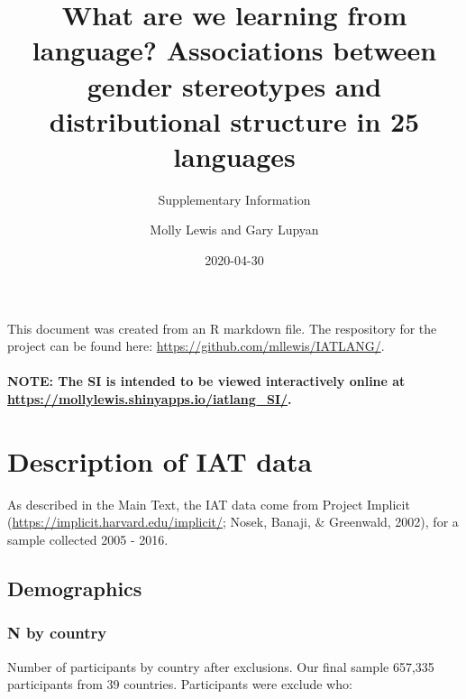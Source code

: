 \documentclass[]{article}
\title{What are we learning from language? Associations between gender
stereotypes and distributional structure in 25 languages}
\subtitle{Supplementary Information}
\author{Molly Lewis and Gary Lupyan}
\date{2020-04-30}
\let\oldparagraph\paragraph
\renewcommand{\paragraph}[1]{\oldparagraph{#1}\mbox{}}
\begin{document}
\maketitle

{
\setcounter{tocdepth}{2}
\tableofcontents
}
\vspace{16pt}

This document was created from an R markdown file. The respository for
the project can be found here:
\url{https://github.com/mllewis/IATLANG/}.

\hypertarget{note-the-si-is-intended-to-be-viewed-interactively-online-at-httpsmollylewis.shinyapps.ioiatlang_si.}{%
\paragraph{\texorpdfstring{NOTE: The SI is intended to be viewed
interactively online at
\url{https://mollylewis.shinyapps.io/iatlang_SI/}.}{NOTE: The SI is intended to be viewed interactively online at https://mollylewis.shinyapps.io/iatlang\_SI/.}}\label{note-the-si-is-intended-to-be-viewed-interactively-online-at-httpsmollylewis.shinyapps.ioiatlang_si.}}

\hypertarget{description-of-iat-data}{%
\section{Description of IAT data}\label{description-of-iat-data}}

As described in the Main Text, the IAT data come from Project Implicit
(\url{https://implicit.harvard.edu/implicit/}; Nosek, Banaji, \&
Greenwald, 2002), for a sample collected 2005 - 2016.

\hypertarget{demographics}{%
\subsection{Demographics}\label{demographics}}

\hypertarget{n-by-country}{%
\subsubsection{N by country}\label{n-by-country}}

Number of participants by country after exclusions. Our final sample
657,335 participants from 39 countries. Participants were exclude who:
\end{document}

